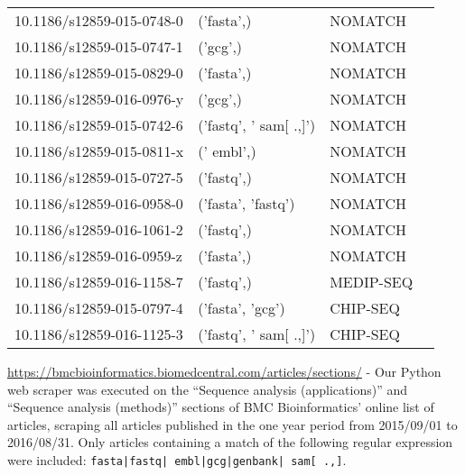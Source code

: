 \begin{table}[ht]
{\begin{threeparttable}
\begin{tabular}{l l l l}
        10.1186/s12859-015-0748-0 & ('fasta',) & NOMATCH & \\
        10.1186/s12859-015-0747-1 & ('gcg',) & NOMATCH & \\
        10.1186/s12859-015-0829-0 & ('fasta',) & NOMATCH & \\
        10.1186/s12859-016-0976-y & ('gcg',) & NOMATCH & \\
        10.1186/s12859-015-0742-6 & ('fastq', ' sam[ .,]') & NOMATCH & \\
        10.1186/s12859-015-0811-x & (' embl',) & NOMATCH & \\
        10.1186/s12859-015-0727-5 & ('fastq',) & NOMATCH & \\
        10.1186/s12859-016-0958-0 & ('fasta', 'fastq') & NOMATCH & \\
        10.1186/s12859-016-1061-2 & ('fastq',) & NOMATCH & \\
        10.1186/s12859-016-0959-z & ('fasta',) & NOMATCH & \\
        10.1186/s12859-016-1158-7 & ('fastq',) & MEDIP-SEQ & \\
        10.1186/s12859-015-0797-4 & ('fasta', 'gcg') & CHIP-SEQ & \\
        10.1186/s12859-016-1125-3 & ('fastq', ' sam[ .,]') & CHIP-SEQ & \\
        \bottomrule
      \end{tabular}
      \normalsize
      \begin{tablenotes}
        \source \url{https://bmcbioinformatics.biomedcentral.com/articles/sections/} - Our Python web scraper was executed on the ``Sequence analysis (applications)'' and ``Sequence analysis (methods)'' sections of BMC Bioinformatics' online list of articles, scraping all articles published in the one year period from 2015/09/01 to 2016/08/31. Only articles containing a match of the following regular expression were included: \texttt{fasta|fastq| embl|gcg|genbank| sam[ .,]}.
      \end{tablenotes}
    \end{threeparttable}}
  \end{table}

